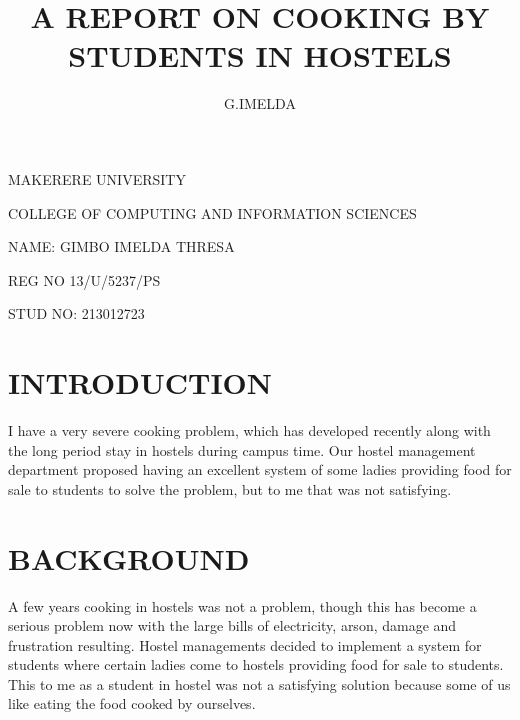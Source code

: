 \documentclass[14pt]{article}
\begin{document}
\begin{center}\begin{small} MAKERERE UNIVERSITY \end{small}\end{center}

\begin{center}\begin{small} COLLEGE OF COMPUTING AND INFORMATION SCIENCES \end{small}\end{center}

\begin{flushleft}\begin{small}NAME:  GIMBO IMELDA THRESA \end{small}\end{flushleft}

\begin{flushleft}\begin{small} REG NO 13/U/5237/PS \end{small}\end{flushleft}

\begin{flushleft}\begin{small} STUD NO: 213012723 \end{small}\end{flushleft}

\author{G.IMELDA}

\title{A REPORT ON COOKING BY STUDENTS IN HOSTELS}

\maketitle

\section{INTRODUCTION}
I have a very severe cooking problem, which has developed recently along with the long period stay in hostels during campus time.  Our hostel management department proposed having an excellent system of some ladies providing food for sale to students to solve the problem, but to me that was not satisfying.          

\section{BACKGROUND}
A few years cooking in hostels was not a problem, though this has become a serious problem now with the large bills of electricity, arson, damage and frustration resulting. Hostel managements decided to implement a system for students where certain ladies come to hostels providing food for sale to students.
This to me as a student in hostel was not a satisfying solution because some of us like eating the food cooked by ourselves. 
\end{document}
